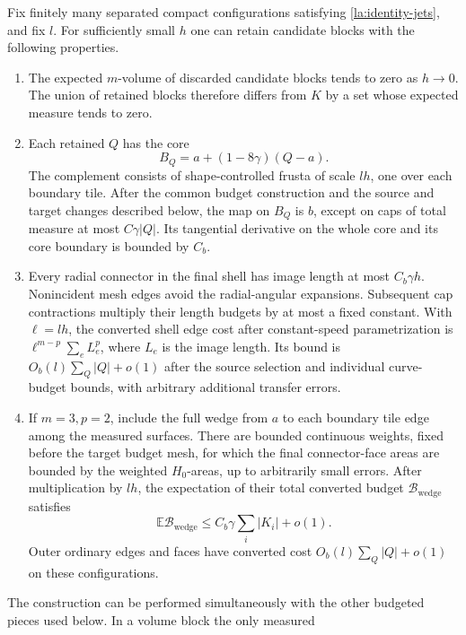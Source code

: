 \begin{lemma}\label{la:radial-blocks}
Fix finitely many separated compact configurations satisfying
\eqref{la:identity-jets}, and fix $l$.  For sufficiently small $h$ one
can retain candidate blocks with the following properties.

\begin{enumerate}
\item The expected $m$-volume of discarded candidate blocks tends to
zero as $h\to0$.  The union of retained blocks therefore differs
from $K$ by a set whose expected measure tends to zero.
\item Each retained $Q$ has the core
\[
 B_Q=a+(1-8\gamma)(Q-a).
\]
The complement consists of shape-controlled frusta of scale $lh$, one
over each boundary tile.  After the common budget construction and
the source and target changes described below, the map on $B_Q$ is
$b$, except on caps of total measure at most $C\gamma |Q|$.  Its
tangential derivative on the whole core and its core boundary is
bounded by $C_b$.
\item Every radial connector in the final shell has image length at
most $C_b\gamma h$.  Nonincident mesh edges avoid the radial-angular
expansions.  Subsequent cap contractions multiply their length
budgets by at most a fixed constant.  With $\ell=lh$, the converted
shell edge cost after constant-speed parametrization is
$\ell^{m-p}\sum_e L_e^p$, where $L_e$ is the image length.
Its bound is $O_b(l)\sum_Q|Q|+o(1)$ after the source selection and
individual curve-budget bounds, with arbitrary additional transfer
errors.
\item If $m=3,p=2$, include the full wedge from $a$ to each boundary
tile edge among the measured surfaces.  There are bounded continuous
weights, fixed before the target budget mesh, for which the final
connector-face areas are bounded by the weighted $H_0$-areas, up to
arbitrarily small errors.  After multiplication by $lh$, the expectation of their total converted budget
$\mathcal B_{\mathrm{wedge}}$ satisfies
\begin{equation}\label{la:wedge-cost}
 \mathbb E\mathcal B_{\mathrm{wedge}}
       \le C_b\gamma\sum_i |K_i|+o(1).
\end{equation}
Outer ordinary edges and faces have converted cost
$O_b(l)\sum_Q|Q|+o(1)$ on these configurations.
\end{enumerate}
The construction can be performed simultaneously with the other
budgeted pieces used below.  In a volume block the only measured

\end{lemma}
